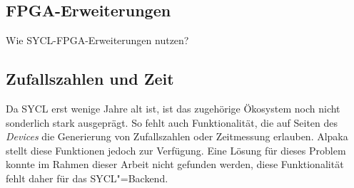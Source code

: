 \subsection{FPGA-Erweiterungen}\label{implementierung:probleme:fpga}

Wie SYCL-FPGA-Erweiterungen nutzen?

\subsection{Zufallszahlen und Zeit}

Da SYCL erst wenige Jahre alt ist, ist das zugehörige Ökosystem noch nicht
sonderlich stark ausgeprägt. So fehlt auch Funktionalität, die auf Seiten des
\textit{Devices} die Generierung von Zufallszahlen oder Zeitmessung erlauben.
Alpaka stellt diese Funktionen jedoch zur Verfügung. Eine Lösung für dieses
Problem konnte im Rahmen dieser Arbeit nicht gefunden werden, diese
Funktionalität fehlt daher für das SYCL"=Backend.
